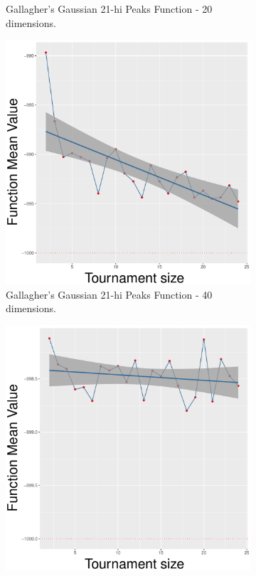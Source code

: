 \begin{figure}[!t]
\begin{subfigure}[b]{0.33\textwidth}
		\caption{Gallagher's Gaussian 21-hi Peaks Function - 20 dimensions.}
	\end{subfigure}
	\begin{subfigure}[b]{0.33\textwidth}
		\centering
		\includegraphics[width=\textwidth]{img/SBX-40D/multimodal_sbx_22_dim_40.pdf}
		\caption{Gallagher's Gaussian 21-hi Peaks Function - 40 dimensions.}
	\end{subfigure}
	\caption{SBX crossover - ($\lambda, \lambda$) scheme.}
	\label{sbx-22-a}
	\begin{subfigure}[b]{0.33\textwidth}
		\centering
		\includegraphics[width=\textwidth]{img/uniform-10D/multimodal_uniform_22_dim_10.pdf}

\end{subfigure}
\end{figure}

